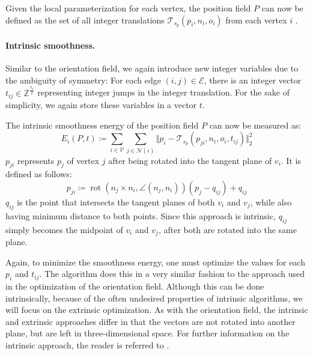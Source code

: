 \documentclass{ACGSeminar}
\DeclareMathOperator{\rot}{rot}
\begin{document}
Given the local parameterization for each vertex, the position field $P$ can now be defined as the set of all integer translations $\mathcal{T}_{s_p}(p_i, n_i, o_i)$ from each vertex $i$ \cite{jakob2015instant}.

\paragraph{Intrinsic smoothness.}
Similar to the orientation field, we again introduce new integer variables due to the ambiguity of symmetry: For each edge $(i,j) \in \mathcal{E}$, there is an integer vector $t_{ij} \in \mathbb{Z}^{\frac{s_p}{2}}$ representing integer jumps in the integer translation. For the sake of simplicity, we again store these variables in a vector $t$.\bigskip

The intrinsic smoothness energy of the position field $P$ can now be measured as:
\begin{equation*}
	E_i(P,t) \coloneqq \sum_{i \in \mathcal{V}} \sum_{j \in \mathcal{N}(i)} \Vert p_i - \mathcal{T}_{s_p}(p_{ji}, n_i, o_i, t_{ij}) \Vert ^2_2
\end{equation*}
$p_{ji}$ represents $p_j$ of vertex $j$ after being rotated into the tangent plane of $v_i$. It is defined as follows:
\begin{equation*}
	p_{ji} \coloneqq \rot(n_j \times n_i, \angle(n_j, n_i)) (p_j - q_{ij}) + q_{ij}
\end{equation*}
$q_{ij}$ is the point that intersects the tangent planes of both $v_i$ and $v_j$, while also having minimum distance to both points. Since this approach is intrinsic, $q_{ij}$ simply becomes the midpoint of $v_i$ and $v_j$, after both are rotated into the same plane.\bigskip

Again, to minimize the smoothness energy, one must optimize the values for each $p_i$ and $t_{ij}$. The algorithm does this in a very similar fashion to the approach used in the optimization of the orientation field. Although this can be done intrinsically, because of the often undesired properties of intrinsic algorithms, we will focus on the extrinsic optimization. As with the orientation field, the intrinsic and extrinsic approaches differ in that the vectors are not rotated into another plane, but are left in three-dimensional space. For further information on the intrinsic approach, the reader is referred to \cite{jakob2015instant}.
\end{document}
